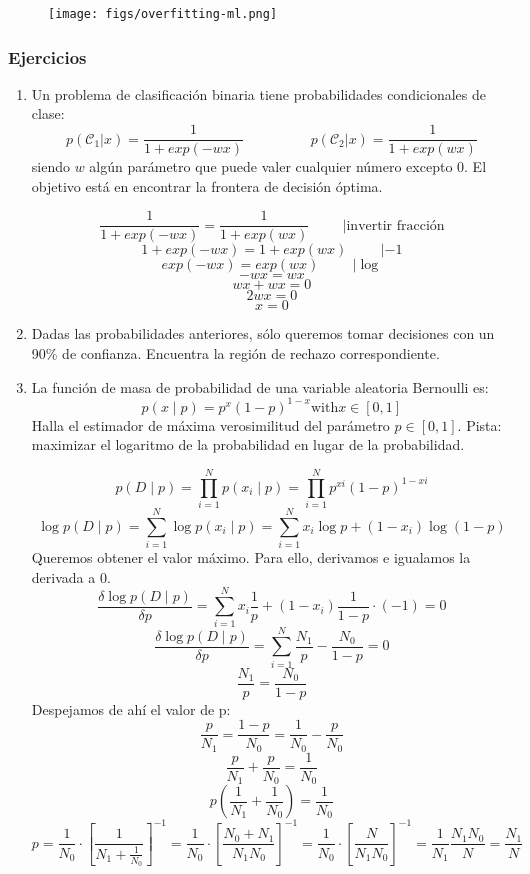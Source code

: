 \begin{figure}[h]
\centering
\texttt{[image: figs/overfitting-ml.png]}
\end{figure}

\subsubsection{Ejercicios}
\begin{enumerate}
\item Un problema de clasificación binaria tiene probabilidades condicionales de clase:
$$p(\mathcal{C}_1 | x) = \frac{1}{1 + exp(-w x)} \hspace{2cm} p(\mathcal{C}_2 | x) = \frac{1}{1 + exp(w x)} $$
siendo $w$ algún parámetro que puede valer cualquier número excepto 0. El objetivo está en encontrar la frontera de decisión óptima.

$$\frac{1}{1 + exp(-w x)} = \frac{1}{1 + exp(w x)} \hspace{1cm} | \text{invertir fracción} $$
$$1 + exp(-w x) = 1 + exp(w x) \hspace{1cm} | -1$$
$$exp(-w x) = exp(w x) \hspace{1cm} | \log$$
$$-w x = w x $$
$$w x + wx = 0$$
$$2wx = 0$$
$$x = 0$$

\item Dadas las probabilidades anteriores, sólo queremos tomar decisiones con un 90\% de confianza. Encuentra la región de rechazo correspondiente.


\item La función de masa de probabilidad de una variable aleatoria Bernoulli es:
$$p(x \mid p) = p^x(1 - p)^{1-x} \text{with} x \in [0, 1]$$
Halla el estimador de máxima verosimilitud del parámetro $p \in [0,1]$. Pista: maximizar el logaritmo de la probabilidad en lugar de la probabilidad.

$$p(D \mid p) = \prod^N_{i = 1} p(x_i \mid p) = \prod^N_{i = 1} p^{xi} (1 - p)^{1-xi}$$
$$\log p(D \mid p) = \sum^N_{i = 1} \log p(x_i \mid p) = \sum^N_{i = 1} x_i \log p + (1 - x_i) \log (1 - p)$$
Queremos obtener el valor máximo. Para ello, derivamos e igualamos la derivada a 0.
$$\frac{\delta \log p(D \mid p)}{\delta p} = \sum^N_{i = 1} x_i \frac{1}{p}+ (1 - x_i) \frac{1}{1 - p} \cdot (-1) = 0$$
$$\frac{\delta \log p(D \mid p)}{\delta p} = \sum^N_{i = 1} \frac{N_1}{p} - \frac{N_0}{1 - p} = 0$$
$$\frac{N_1}{p} = \frac{N_0}{1 - p}$$
Despejamos de ahí el valor de p:
$$\frac{p}{N_1} = \frac{1 - p}{N_0} = \frac{1}{N_0} - \frac{p}{N_0}$$
$$\frac{p}{N_1} + \frac{p}{N_0} = \frac{1}{N_0}$$
$$p(\frac{1}{N_1} + \frac{1}{N_0}) = \frac{1}{N_0}$$
$$p = \frac{1}{N_0} \cdot [\frac{1}{N_1 + \frac{1}{N_0}}]^{-1} = \frac{1}{N_0} \cdot [\frac{N_0 + N_1}{N_1N_0}]^{-1} = \frac{1}{N_0} \cdot [\frac{N}{N_1N_0}]^{-1} = \frac{1}{N_1} \frac{N_1N_0}{N} = \frac{N_1}{N}$$
\end{enumerate}

